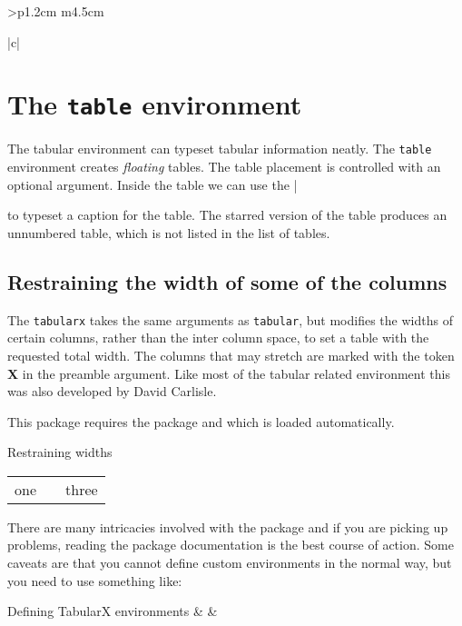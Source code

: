 \begin{tabular}{>{\bfseries}p{1.2cm} m{4.5cm}}
\begin{tabular}[t]{|c|}
\section{The \texttt{table} environment}

The tabular environment can typeset tabular information neatly. The \texttt{table} environment creates \textit{floating} tables. The table placement is controlled with an optional argument. Inside the table we can use the |\caption| to typeset a caption for the table. The starred version of the table produces an unnumbered table, which is not listed in the list of tables.






\subsection{Restraining the width of some of the columns}

The \texttt{tabularx} takes the same arguments
as \texttt{tabular}, but modifies the widths of certain columns, rather than
the inter column space, to set a table with the requested total width. The
columns that may stretch are marked with the token \textbf{X} in the preamble argument. Like most of the tabular related environment this was also developed by David Carlisle.



This package requires the  package and which is loaded automatically.

\begin{texexample}{Restraining widths}{}
\begin{tabularx}{\linewidth-3cm}{|c|X|c|}
   one & \lipsum[1] &three \\
\end{tabularx}
\end{texexample}

There are many intricacies involved with the package and if you are picking up problems, reading the package documentation is the best course of action. Some caveats are that you cannot define custom environments in the normal way, but you need to use something like:

\begin{teXXX}
\newenvironment{foo}{\tabularx{XX}}{\endtabularx}
\end{teXXX}

\begin{texexample}{Defining TabularX environments}{}
\newenvironment{XXX}{
}{
\endtabularx}
\begin{XXX}
\lorem & \lorem &\lorem\\
\end{XXX}
\end{texexample}



\end{tabular}
\end{tabular}
